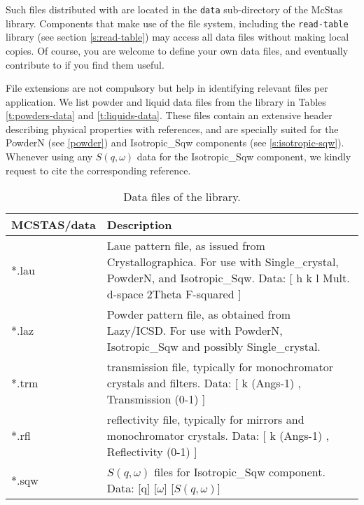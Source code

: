 Such files distributed with \MCS are located in the
\verb+data+ sub-directory of the McStas library.
Components that make use of the \MCS file system,
including the \verb+read-table+ library (see section \ref{s:read-table})
may access all \MCS data files without making local copies.
Of course, you are welcome to define your own data files,
and eventually contribute to \MCS if you find them useful.

File extensions are not compulsory but help in identifying relevant files per application. We list powder and liquid data files from the \MCS library in Tables \ref{t:powders-data} and \ref{t:liquids-data}. These files contain an extensive header describing physical properties with references, and are specially suited for the PowderN (see \ref{powder}) and Isotropic\_Sqw components (see \ref{s:isotropic-sqw}). Whenever using any $S(q,\omega)$ data for the Isotropic\_Sqw component, we kindly request to cite the corresponding reference.

\begin{table}
  \begin{center}
    {\let\my=\\
    \begin{tabular}{|p{}|p{}|}
      \hline
       {\bf MCSTAS/data} & Description \\
       \hline
 *.lau & Laue pattern file, as issued from Crystallographica.
       For use with Single\_crystal, PowderN, and Isotropic\_Sqw.
       Data: [ h   k   l Mult. d-space 2Theta   F-squared ] \\
 *.laz & Powder pattern file, as obtained from Lazy/ICSD.
       For use with PowderN, Isotropic\_Sqw and possibly Single\_crystal.\\
 *.trm & transmission file, typically for monochromator crystals and filters.
       Data: [ k (Angs-1) , Transmission (0-1) ] \\
 *.rfl & reflectivity file, typically for mirrors and monochromator crystals.
       Data: [ k (Angs-1) , Reflectivity (0-1) ] \\
 *.sqw & $S(q,\omega)$ files for Isotropic\_Sqw component.
       Data: [q] [$\omega$] [$S(q,\omega)$]\\
      \hline
    \end{tabular}
    \caption{Data files of the \MCS library.}
    \label{t:comp-data}
    }
  \end{center}
\end{table}


